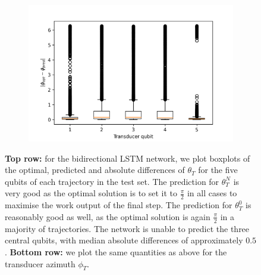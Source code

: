 \begin{figure}
\begin{subfigure}{0.32\textwidth}
\end{subfigure}
\begin{subfigure}{0.32\textwidth}
	\centering
	\includegraphics[width=\textwidth]{img/delta_phi_box}
\end{subfigure}
\caption{\textbf{Top row:} for the bidirectional LSTM network, we plot boxplots of the optimal, predicted and absolute differences of $\theta_T$ for the five qubits of each trajectory in the test set. The prediction for $\theta_T^N$ is very good as the optimal solution is to set it to $\frac{\pi}{2}$ in all cases to maximise the work output of the final step. The prediction for $\theta_T^0$ is reasonably good as well, as the optimal solution is again $\frac{\pi}{2}$ in a majority of trajectories. The network is unable to predict the three central qubits, with median absolute differences of approximately $0.5$. \textbf{Bottom row:} we plot the same quantities as above for the transducer azimuth $\phi_T$.}
\label{bilstmbox}
\end{figure}
